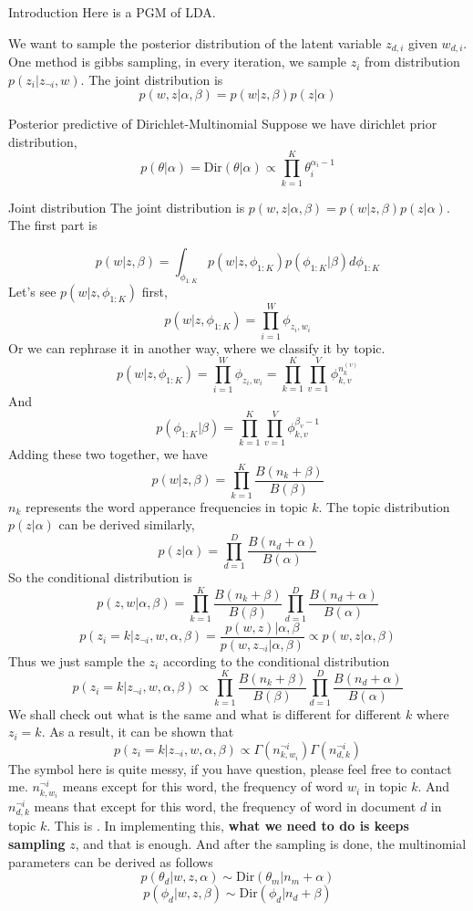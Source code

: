 \begin{frame}{Introduction}
Here is a PGM of LDA.

We want to sample the posterior distribution of the latent variable $z_{d,i}$ given $w_{d,i}$. One method is gibbs sampling, in every iteration, we sample $z_i$ from distribution $p(z_i | z_{\neg i}, w)$.
The joint distribution is 
$$p(w,z | \alpha, \beta) = p(w | z, \beta) p(z | \alpha)$$
\end{frame}
\begin{frame}{Posterior predictive of Dirichlet-Multinomial}
Suppose we have dirichlet prior distribution,
$$p(\theta | \alpha) = \text{Dir}(\theta | \alpha) \propto \prod_{k=1}^K \theta_i^{\alpha_i - 1}$$

\end{frame}
\begin{frame}[allowframebreaks]{Joint distribution}
The joint distribution is $p(w,z | \alpha, \beta) = p(w | z, \beta) p(z | \alpha)$. The first part is

$$p(w | z, \beta) = \int_{\phi_{1 : K}} p(w | z, \phi_{1 : K})p(\phi_{1 : K} | \beta)d \phi_{1 :K}$$
Let's see $p(w | z, \phi_{1 : K})$ first, 
$$p(w | z, \phi_{1 : K}) = \prod_{i=1}^W \phi_{z_i, w_i}$$
Or we can rephrase it in another way, where we classify it by topic.
$$p(w | z, \phi_{1 : K}) = \prod_{i=1}^W \phi_{z_i, w_i} = \prod_{k=1}^K \prod_{v=1}^V \phi_{k,v}^{n_k^{(v)}}$$
And $$p(\phi_{1 : K} | \beta) = \prod_{k=1}^K \prod_{v=1}^V \phi_{k,v}^{\beta_v - 1} $$
Adding these two together, we have
$$p(w | z, \beta) = \prod_{k=1}^K \frac{B(n_k + \beta)}{B(\beta)}$$
$n_k$ represents the word apperance frequencies in topic $k$.
The topic distribution $p(z | \alpha)$ can be derived similarly,
$$p(z | \alpha) = \prod_{d=1}^D\frac{B(n_d + \alpha)}{B(\alpha)}$$
So the conditional distribution is
$$p(z,w | \alpha, \beta) = \prod_{k=1}^K \frac{B(n_k + \beta)}{B(\beta)}\prod_{d=1}^D\frac{B(n_d + \alpha)}{B(\alpha)}$$
$$p(z_i = k | z_{\neg i}, w, \alpha, \beta) = \frac{p(w,z) | \alpha, \beta}{p(w, z_{\neg i} | \alpha, \beta)} \propto p(w,z | \alpha, \beta) $$
Thus we just sample the $z_i$ according to the conditional distribution
$$p(z_i = k | z_{\neg i}, w, \alpha, \beta) \propto \prod_{k=1}^K \frac{B(n_k + \beta)}{B(\beta)}\prod_{d=1}^D\frac{B(n_d + \alpha)}{B(\alpha)}$$
We shall check out what is the same and what is different for different $k$ where $z_i = k$. As a result, it can be shown that 
$$p(z_i = k | z_{\neg i}, w, \alpha, \beta) \propto \Gamma(n_{k, w_i}^{\neg i}) \Gamma(n_{d, k}^{\neg i})$$
The symbol here is quite messy, if you have question, please feel free to contact me. $n_{k, w_i}^{\neg i}$ means except for this word, the frequency of word $w_i$ in topic $k$. And $n_{d, k}^{\neg i}$ means that except for this word, the frequency of word in document $d$ in topic $k$.
This is . In implementing this, \textbf{what we need to do is keeps sampling} $z$, and that is enough.
And after the sampling is done, the multinomial parameters can be derived as follows
$$p(\theta_d | w, z, \alpha) \sim \text{Dir}(\theta_m | n_m + \alpha)$$
$$p(\phi_d | w, z, \beta) \sim \text{Dir}(\phi_d | n_d + \beta) $$
\end{frame}
